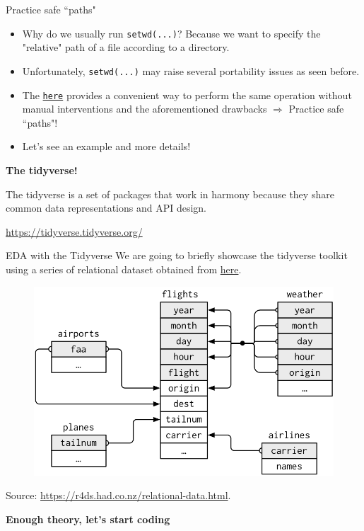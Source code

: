 \documentclass[
hyperref={bookmarks=false},
xcolor={dvipsnames,svgnames*,x11names*}, 
12pt
]{beamer}
\begin{document}
\begin{frame}{Practice safe ``paths"}
\vspace{-0.5cm}
\begin{itemize}
\itemsep 3ex
\item Why do we usually run \texttt{setwd(...)}? Because we want to specify the "relative" path of a file according to a directory. 
\item Unfortunately, \texttt{setwd(...)} may raise several portability issues as seen before. 
\item The \href{https://here.r-lib.org/}{\texttt{here}}  provides a convenient way to perform the same operation without manual interventions and the aforementioned drawbacks $\Longrightarrow$ Practice safe ``paths"! 
\item Let's see an example and more details!
\end{itemize}
\end{frame}

\begin{frame}
\vspace{2cm}
\begin{center}
\Huge
\textbf{The tidyverse!}
\end{center}
\vspace{1.5cm}
\epigraph{The tidyverse is a set of packages that work in harmony because they share common data representations and API design.}{\url{https://tidyverse.tidyverse.org/}}
\end{frame}

\begin{frame}{EDA with the Tidyverse}
\vspace{-0.5cm}
We are going to briefly showcase the tidyverse toolkit using a series of relational dataset obtained from \href{https://www.data.gov.uk/dataset/cb7ae6f0-4be6-4935-9277-47e5ce24a11f/road-safety-data}{here}.
\begin{figure}
\centering
\includegraphics[width=0.8\linewidth]{figures/relational-nycflights.png}
\end{figure}
{\small Source: \url{https://r4ds.had.co.nz/relational-data.html}.}
\end{frame}

\begin{frame}
\vspace{2cm}
\begin{center}
\Huge
\textbf{Enough theory, let's start coding }
\end{center}
\end{frame}
\end{document}
